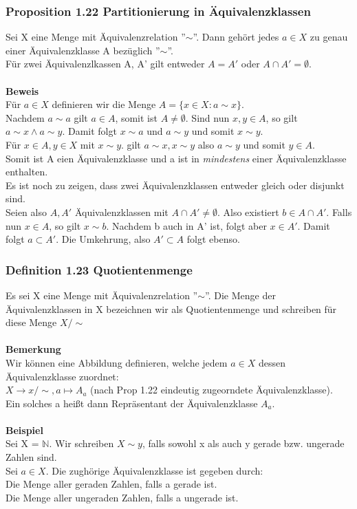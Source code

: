 \documentclass{scrartcl}
\newcommand{\mN}{\(\mathbb{N}\)}
\begin{document}
\subsubsection{Proposition 1.22 Partitionierung in \"Aquivalenzklassen}
Sei X eine Menge mit \"Aquivalenzrelation ''\(\sim\)''. Dann geh\"ort jedes \(a \in X\) zu genau einer \"Aquivalenzklasse A bez\"uglich ''\(\sim\)''.\\
F\"ur zwei \"Aquivalenzlkassen A, A' gilt entweder \(A = A'\) oder \(A\cap A' = \emptyset\).\\
\\
\textbf{Beweis}\\
F\"ur \(a \in X\) definieren wir die Menge \(A = \{x \in X : a \sim x\}\).\\
Nachdem \(a \sim a\) gilt \(a \in A\), somit ist \(A \neq \emptyset\). Sind nun \(x, y \in A\), so gilt \(a \sim x \land a \sim y\). Damit folgt \(x \sim a\) und \(a \sim y\) und somit \(x \sim y\).\\
F\"ur \(x \in A, y \in X\) mit \(x \sim y\). gilt \(a \sim x, x \sim y\) also \(a \sim y\) und somit \(y \in A\).\\
Somit ist A eien \"Aquivalenzklasse und a ist in \textit{mindestens} einer \"Aquivalenzklasse enthalten.\\
Es ist noch zu zeigen, dass zwei \"Aquivalenzklassen entweder gleich oder disjunkt sind.\\
Seien also \(A, A'\) \"Aquivalenzklassen mit \(A \cap A' \neq \emptyset\). Also existiert \(b \in A\cap A'\). Falls nun \(x \in A\), so gilt \(x \sim b\). Nachdem b auch in A' ist, folgt aber \(x \in A'\). Damit folgt \(a \subset A'\). Die Umkehrung, also \(A' \subset A\) folgt ebenso.

\subsubsection{Definition 1.23 Quotientenmenge}
Es sei X eine Menge mit \"Aquivalenzrelation ''\(\sim\)''. Die Menge der \"Aquivalenzklassen in X bezeichnen wir  als Quotientenmenge und schreiben
 f\"ur diese Menge \(X/{\sim}\)\\
 \\
 \textbf{Bemerkung}\\
 Wir k\"onnen eine Abbildung definieren, welche jedem \(a \in X\) dessen \"Aquivalenzklasse zuordnet:\\
 \(X \to x/{\sim}, a \mapsto A_a\) (nach Prop 1.22 eindeutig zugeorndete \"Aquivalenzklasse).\\
 Ein solches a hei\ss{}t dann Repr\"asentant der \"Aquivalenzklasse \(A_a\).\\
 \\
 \textbf{Beispiel}\\
 Sei X = \mN. Wir schreiben \(X \sim y\), falls sowohl x als auch y gerade bzw. ungerade Zahlen sind.\\
 Sei \(a \in X\). Die zugh\"orige \"Aquivalenzklasse ist gegeben durch:\\
 Die Menge aller geraden Zahlen, falls a gerade ist.\\
 Die Menge aller ungeraden Zahlen, falls a ungerade ist.
\end{document}
